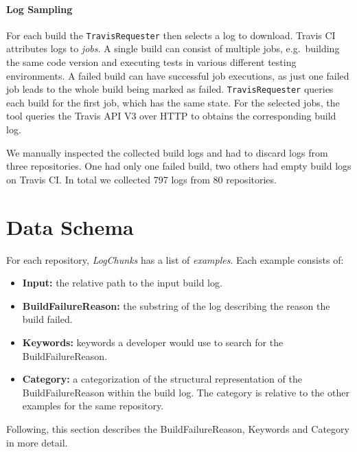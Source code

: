 \documentclass[\myrootdir/main.tex]{subfiles}
\begin{document}
\paragraph{Log Sampling}
For each build the \texttt{TravisRequester} then selects a log to download.
Travis CI attributes logs to \emph{jobs}.
A single build can consist of multiple jobs, e.g.\ building the same code version and executing tests in various different testing environments.
A failed build can have successful job executions, as just one failed job leads to the whole build being marked as failed.
\texttt{TravisRequester} queries each build for the first job, which has the same state.
For the selected jobs, the tool queries the Travis API V3 over HTTP to obtains the corresponding build log.

We manually inspected the collected build logs and had to discard logs from three repositories.
One had only one failed build, two others had empty build logs on Travis CI\@.
In total we collected 797 logs from 80 repositories.

\section{Data Schema}
\label{sec:data-schema}
For each repository, \emph{LogChunks} has a list of \emph{examples}.
Each example consists of:
\begin{itemize}
	\item \textbf{Input:} the relative path to the input build log.
	\item \textbf{BuildFailureReason:} the substring of the log describing the reason the build failed.
	\item \textbf{Keywords:} keywords a developer would use to search for the BuildFailureReason.
	\item \textbf{Category:} a categorization of the structural representation of the BuildFailureReason within the build log.
				The category is relative to the other examples for the same repository.
\end{itemize}
Following, this section describes the BuildFailureReason, Keywords and Category in more detail.
\end{document}
